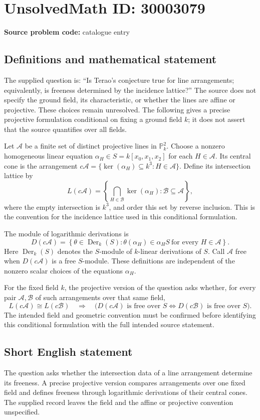 \documentclass[11pt]{article}
\newcommand{\PP}{\mathbb{P}}
\begin{document}
\section*{UnsolvedMath ID: 30003079}
\textbf{Source problem code:} catalogue entry
\subsection{Definitions and mathematical statement}
The supplied question is: ``Is Terao's conjecture true for line arrangements; equivalently, is freeness determined by the incidence lattice?'' The source does not specify the ground field, its characteristic, or whether the lines are affine or projective. These choices remain unresolved. The following gives a precise projective formulation conditional on fixing a ground field \(k\); it does not assert that the source quantifies over all fields.

Let \(\mathcal A\) be a finite set of distinct projective lines in \(\PP^2_k\). Choose a nonzero homogeneous linear equation \(\alpha_H\in S=k[x_0,x_1,x_2]\) for each \(H\in\mathcal A\). Its central cone is the arrangement \(c\mathcal A=\{\ker(\alpha_H)\subseteq k^3:H\in\mathcal A\}\). Define its intersection lattice by
\[
L(c\mathcal A)=\left\{\bigcap_{H\in\mathcal B}\ker(\alpha_H):\mathcal B\subseteq\mathcal A\right\},
\]
where the empty intersection is \(k^3\), and order this set by reverse inclusion. This is the convention for the incidence lattice used in this conditional formulation.

The module of logarithmic derivations is
\[
D(c\mathcal A)=\left\{\theta\in\operatorname{Der}_k(S):\theta(\alpha_H)\in\alpha_H S\ \text{for every }H\in\mathcal A\right\}.
\]
Here \(\operatorname{Der}_k(S)\) denotes the \(S\)-module of \(k\)-linear derivations of \(S\). Call \(\mathcal A\) free when \(D(c\mathcal A)\) is a free \(S\)-module. These definitions are independent of the nonzero scalar choices of the equations \(\alpha_H\).

For the fixed field \(k\), the projective version of the question asks whether, for every pair \(\mathcal A,\mathcal B\) of such arrangements over that same field,
\[
L(c\mathcal A)\cong L(c\mathcal B)
\quad\Longrightarrow\quad
\bigl(D(c\mathcal A)\text{ is free over }S\iff D(c\mathcal B)\text{ is free over }S\bigr).
\]
The intended field and geometric convention must be confirmed before identifying this conditional formulation with the full intended source statement.
\subsection{Short English statement}
The question asks whether the intersection data of a line arrangement determine its freeness. A precise projective version compares arrangements over one fixed field and defines freeness through logarithmic derivations of their central cones. The supplied record leaves the field and the affine or projective convention unspecified.
\end{document}
